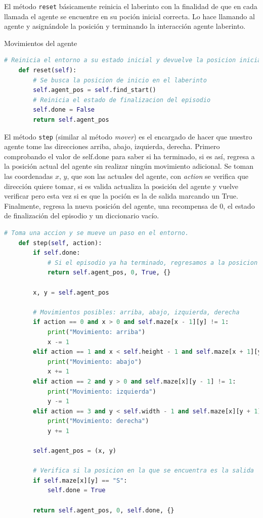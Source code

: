 \documentclass[a4paper,12pt]{article}
\begin{document}
\noindent El método \texttt{reset} básicamente reinicia el laberinto con la finalidad 
de que en cada llamada el agente se encuentre en su poción inicial correcta. Lo hace 
llamando al agente y asignándole la posición y terminando la interacción agente laberinto.

\begin{center}
    \Large{Movimientos del agente}
\end{center}

\begin{lstlisting}[style=mystylepython, language=Python, caption= metodo reset]
    # Reinicia el entorno a su estado inicial y devuelve la posicion inicial del agente.
    def reset(self):
        # Se busca la posicion de inicio en el laberinto
        self.agent_pos = self.find_start() 
        # Reinicia el estado de finalizacion del episodio
        self.done = False  
        return self.agent_pos
\end{lstlisting}        


\noindent El método \texttt{step} (similar al método \textit{mover}) es el encargado de 
hacer que nuestro agente tome las direcciones arriba, abajo, izquierda, derecha. Primero 
comprobando el valor de self.done para saber si ha terminado, si es así, regresa a la 
posición actual del agente sin realizar ningún movimiento adicional. Se toman las 
coordenadas $x$, $y$, que son las actuales del agente, con \textit{action} se verifica que 
dirección quiere tomar, si es valida actualiza la posición del agente y vuelve verificar 
pero esta vez si es que la poción es la de salida marcando un True. Finalmente, 
regresa la nueva posición del agente, una recompensa de 0, el estado de finalización 
del episodio y un diccionario vacío.

\begin{lstlisting}[style=mystylepython, language=Python, caption= metodo step]
    # Toma una accion y se mueve un paso en el entorno.
    def step(self, action):
        if self.done:
            # Si el episodio ya ha terminado, regresamos a la posicion actual
            return self.agent_pos, 0, True, {}
    
        x, y = self.agent_pos
    
        # Movimientos posibles: arriba, abajo, izquierda, derecha
        if action == 0 and x > 0 and self.maze[x - 1][y] != 1:
            print("Movimiento: arriba")
            x -= 1
        elif action == 1 and x < self.height - 1 and self.maze[x + 1][y] != 1:
            print("Movimiento: abajo")
            x += 1
        elif action == 2 and y > 0 and self.maze[x][y - 1] != 1:
            print("Movimiento: izquierda")
            y -= 1
        elif action == 3 and y < self.width - 1 and self.maze[x][y + 1] != 1:
            print("Movimiento: derecha")
            y += 1
    
        self.agent_pos = (x, y)
    
        # Verifica si la posicion en la que se encuentra es la salida
        if self.maze[x][y] == "S":
            self.done = True
    
        return self.agent_pos, 0, self.done, {}
\end{lstlisting}        
\end{document}

